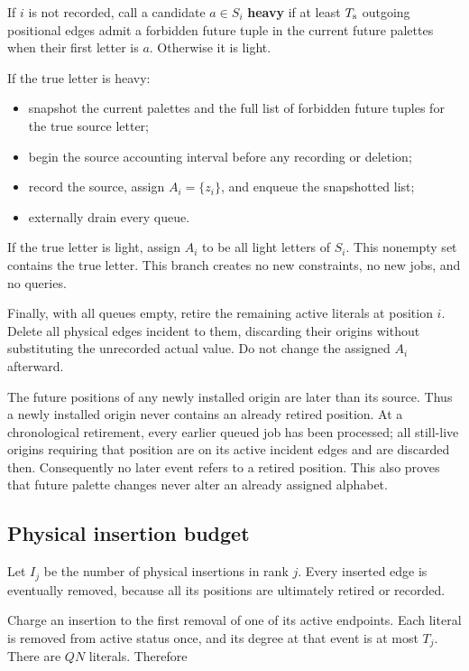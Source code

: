 If \(i\) is not recorded, call a candidate \(a\in S_i\) \textbf{heavy} if at least \(T_{\rm s}\) outgoing positional edges admit a forbidden future tuple in the current future palettes when their first letter is \(a\). Otherwise it is light.

If the true letter is heavy:

\begin{itemize}
\tightlist
\item
  snapshot the current palettes and the full list of forbidden future tuples for the true source letter;
\item
  begin the source accounting interval before any recording or deletion;
\item
  record the source, assign \(A_i=\{z_i\}\), and enqueue the snapshotted list;
\item
  externally drain every queue.
\end{itemize}

If the true letter is light, assign \(A_i\) to be all light letters of \(S_i\). This nonempty set contains the true letter. This branch creates no new constraints, no new jobs, and no queries.

Finally, with all queues empty, retire the remaining active literals at position \(i\). Delete all physical edges incident to them, discarding their origins without substituting the unrecorded actual value. Do not change the assigned \(A_i\) afterward.

The future positions of any newly installed origin are later than its source. Thus a newly installed origin never contains an already retired position. At a chronological retirement, every earlier queued job has been processed; all still-live origins requiring that position are on its active incident edges and are discarded then. Consequently no later event refers to a retired position. This also proves that future palette changes never alter an already assigned alphabet.

\subsection{Physical insertion budget}\label{physical-insertion-budget}

Let \(I_j\) be the number of physical insertions in rank \(j\). Every inserted edge is eventually removed, because all its positions are ultimately retired or recorded.

Charge an insertion to the first removal of one of its active endpoints. Each literal is removed from active status once, and its degree at that event is at most \(T_j\). There are \(QN\) literals. Therefore

